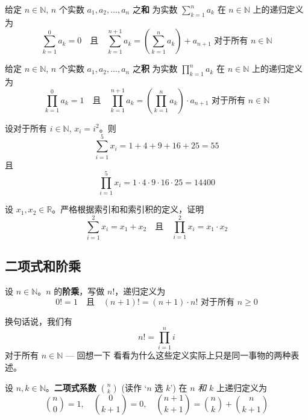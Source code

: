 \begin{definition}
\label{defSumOfRealNumbers}
给定 $n \in \mathbb{N}$, $n$ 个实数 $a_1, a_2, \dots, a_n$ 之\textbf{和} 为实数 $\sum_{k=1}^n a_k$ 在 $n \in \mathbb{N}$ 上的递归定义为
\[ \sum_{k=1}^0 a_k = 0 \quad \text{且} \quad \sum_{k=1}^{n+1} a_k = \left( \sum_{k=1}^n a_k \right) + a_{n+1} \text{ 对于所有 } n \in \mathbb{N} \]
\end{definition}

\begin{definition}
\label{defProductOfRealNumbers}
给定 $n \in \mathbb{N}$, $n$ 个实数 $a_1, a_2, \dots, a_n$ 之\textbf{积} 为实数 $\prod_{k=1}^n a_k$ 在 $n \in \mathbb{N}$ 上的递归定义为
\[ \prod_{k=1}^0 a_k = 1 \quad \text{且} \quad \prod_{k=1}^{n+1} a_k = \left( \prod_{k=1}^n a_k \right) \cdot a_{n+1} \text{ 对于所有 } n \in \mathbb{N} \]
\end{definition}

\begin{example}
设对于所有 $i \in \mathbb{N}$, $x_i=i^2$。则
\[ \sum_{i=1}^5 x_i = 1 + 4 + 9 + 16 + 25 = 55 \]
且
\[ \prod_{i=1}^5 x_i = 1 \cdot 4 \cdot 9 \cdot 16 \cdot 25 = 14400 \]
\end{example}

\begin{exercise}
设 $x_1, x_2 \in \mathbb{R}$。严格根据索引和和索引积的定义，证明
\[ \sum_{i=1}^2 x_i = x_1 + x_2 \quad \text{且} \quad \prod_{i=1}^2 x_i = x_1 \cdot x_2 \]
\end{exercise}

\subsection*{二项式和阶乘}

\begin{definition}
\label{defFactorialRecursive}
设 $n \in \mathbb{N}$。$n$ 的\textbf{阶乘}，写做 $n!$，递归定义为
\[ 0! = 1 \quad \text{且} \quad (n+1)! = (n+1) \cdot n! \text{ 对于所有 } n \ge 0 \]
\end{definition}

换句话说，我们有
\[ n! = \prod_{i=1}^n i \]
对于所有 $n \in \mathbb{N}$ --- 回想一下  看看为什么这些定义实际上只是同一事物的两种表述。

\begin{definition}
\label{defBinomialCoefficientRecursive}
设 $n,k \in \mathbb{N}$。\textbf{二项式系数} $\binom{n}{k}$  (读作 `$n$ 选 $k$') 在 $n$ \textit{和} $k$ 上递归定义为
\[ \binom{n}{0}=1, \quad \binom{0}{k+1} = 0, \quad \binom{n+1}{k+1} = \binom{n}{k} + \binom{n}{k+1} \]
\end{definition}

